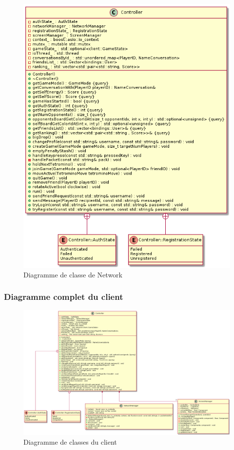 \documentclass{article}
\begin{document}
\begin{figure}[H]
	\centering
	 \includegraphics[scale=0.3]{../res/uml/class/ControllerClass.png}
	 \caption{Diagramme de classe de Network}
	 \label{fig:ControllerDiagram}
\end{figure}

\subsubsection{Diagramme complet du client}

\begin{figure}[H]
	\centering
	 \includegraphics[scale=0.3]{../res/uml/class/ClientStructureClass.png}
	 \caption{Diagramme de classes du client}
	 \label{fig:WholeClientDiagram}
\end{figure}
\end{document}
